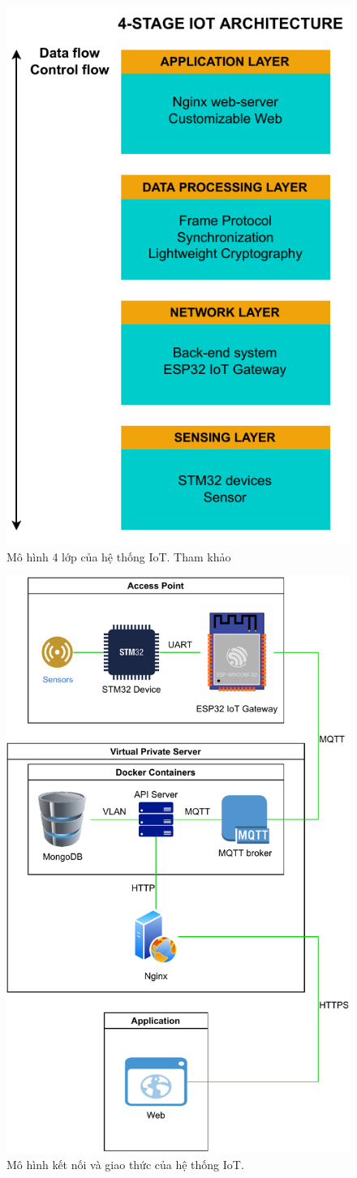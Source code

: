 \begin{figure}[htp]
\centering
\includegraphics[width=8 cm]{images/Thesis-Page-2-IoT-Archi.pdf}
\caption{Mô hình 4 lớp của hệ thống IoT. Tham khảo \cite{IoT-4-Layer-Archi}}
\label{fig:IoT-4-Layer-Archi}
\end{figure}

\begin{figure}[htp]
\centering
\includegraphics[width=0.75\linewidth]{images/Thesis-Page-3-IoT-Connections-Model.pdf}
\caption{Mô hình kết nối và giao thức của hệ thống IoT.}
\label{fig:IoT-Connections-Model}
\end{figure}

